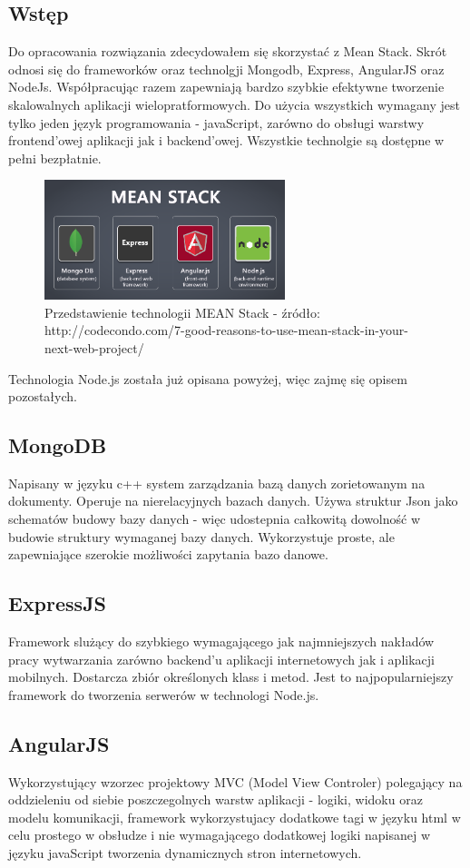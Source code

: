 \documentclass[12pt]{report}
\begin{document}
\subsection{Wstęp}
Do opracowania rozwiązania zdecydowałem się skorzystać z Mean Stack. 
Skrót odnosi się do frameworków oraz technolgji Mongodb, Express, AngularJS oraz NodeJs. 
Współpracując razem zapewniają bardzo szybkie efektywne tworzenie skalowalnych aplikacji wielopratformowych. 
Do użycia wszystkich wymagany jest tylko jeden język programowania - javaScript, zarówno do obsługi warstwy frontend'owej aplikacji jak i backend'owej. 
Wszystkie technolgie są dostępne w pełni bezpłatnie. 
\begin{figure}[!t]
\centering
\includegraphics[width=7cm]{meanStack.png} 
\caption{Przedstawienie technologii MEAN Stack - źródło: http://codecondo.com/7-good-reasons-to-use-mean-stack-in-your-next-web-project/}
\end{figure}

Technologia Node.js została już opisana powyżej, więc zajmę się opisem pozostałych.

\subsection{MongoDB}
Napisany w języku c++ system zarządzania bazą danych zorietowanym na dokumenty. 
Operuje na nierelacyjnych bazach danych. 
Używa struktur Json jako schematów budowy bazy danych - więc udostepnia całkowitą dowolność w budowie struktury wymaganej bazy danych. 
Wykorzystuje proste, ale zapewniające szerokie możliwości zapytania bazo danowe.

\subsection{ExpressJS }
Framework slużący do szybkiego wymagającego jak najmniejszych nakładów pracy wytwarzania zarówno backend’u aplikacji internetowych jak i aplikacji mobilnych.
Dostarcza zbiór określonych klass i metod. Jest to najpopularniejszy framework do tworzenia serwerów w technologi Node.js.

\subsection{AngularJS}
Wykorzystujący wzorzec projektowy MVC (Model View Controler) polegający na oddzieleniu od siebie poszczegolnych warstw aplikacji - logiki, widoku oraz modelu komunikacji, framework wykorzystujacy dodatkowe tagi w języku html w celu prostego w obsłudze i nie wymagającego dodatkowej logiki napisanej w języku javaScript tworzenia dynamicznych stron internetowych.
\end{document}
